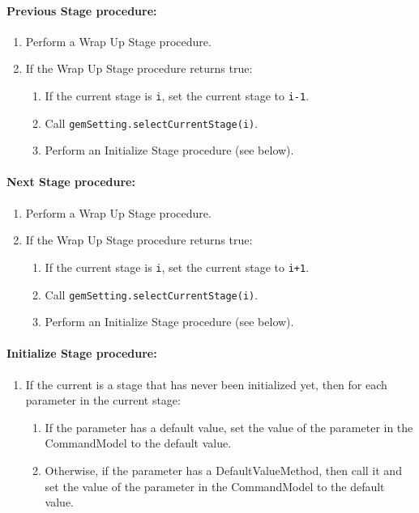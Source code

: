 \documentclass[11pt]{article}
\begin{document}
\paragraph{Previous Stage procedure:}
\begin{enumerate}
\item Perform a Wrap Up Stage procedure.
\item If the Wrap Up Stage procedure returns true:
  \begin{enumerate}
  \item If the current stage is \verb/i/, set the current stage to \verb/i-1/.
  \item Call {\tt gemSetting.selectCurrentStage(i)}.
  \item Perform an Initialize Stage procedure (see below).
  \end{enumerate}
\end{enumerate}

\paragraph{Next Stage procedure:}
\begin{enumerate}
\item Perform a Wrap Up Stage procedure.
\item If the Wrap Up Stage procedure returns true:
  \begin{enumerate}
  \item If the current stage is \verb/i/, set the current stage to \verb/i+1/.
  \item Call {\tt gemSetting.selectCurrentStage(i)}.
  \item Perform an Initialize Stage procedure (see below).
  \end{enumerate}
\end{enumerate}

\paragraph{Initialize Stage procedure:}
\begin{enumerate}
\item If the current is a stage that has never been initialized yet, then
  for each parameter in the current stage:
  \begin{enumerate}
  \item If the parameter has a default value, set the value of the
    parameter in the CommandModel to the default value.
  \item Otherwise, if the parameter has a DefaultValueMethod, then call it
    and set the value of the parameter in the CommandModel to the default
    value.
  \end{enumerate}
\end{enumerate}
\end{document}
